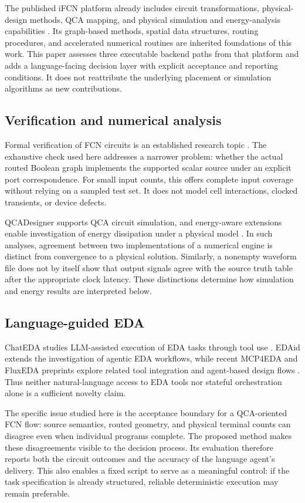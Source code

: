 \documentclass[ASNA,twocolumn]{USG}
\begin{document}
The published iFCN platform already includes circuit transformations, physical-design methods, QCA mapping, and physical simulation and energy-analysis capabilities \cite{Li2026iFCN}. Its graph-based methods, spatial data structures, routing procedures, and accelerated numerical routines are inherited foundations of this work. This paper assesses three executable backend paths from that platform and adds a language-facing decision layer with explicit acceptance and reporting conditions. It does not reattribute the underlying placement or simulation algorithms as new contributions.

\subsection{Verification and numerical analysis}
Formal verification of FCN circuits is an established research topic \cite{Walter2020Verification}. The exhaustive check used here addresses a narrower problem: whether the actual routed Boolean graph implements the supported scalar source under an explicit port correspondence. For small input counts, this offers complete input coverage without relying on a sampled test set. It does not model cell interactions, clocked transients, or device defects.

QCADesigner supports QCA circuit simulation, and energy-aware extensions enable investigation of energy dissipation under a physical model \cite{Walus2004QCADesigner,SillTorres2018Energy}. In such analyses, agreement between two implementations of a numerical engine is distinct from convergence to a physical solution. Similarly, a nonempty waveform file does not by itself show that output signals agree with the source truth table after the appropriate clock latency. These distinctions determine how simulation and energy results are interpreted below.

\subsection{Language-guided EDA}
ChatEDA studies LLM-assisted execution of EDA tasks through tool use \cite{Wu2024ChatEDA}. EDAid extends the investigation of agentic EDA workflows, while recent MCP4EDA and FluxEDA preprints explore related tool integration and agent-based design flows \cite{Wu2025EDAid,Wang2025MCP4EDA,Chen2026FluxEDA}. Thus neither natural-language access to EDA tools nor stateful orchestration alone is a sufficient novelty claim.

The specific issue studied here is the acceptance boundary for a QCA-oriented FCN flow: source semantics, routed geometry, and physical terminal counts can disagree even when individual programs complete. The proposed method makes these disagreements visible to the decision process. Its evaluation therefore reports both the circuit outcomes and the accuracy of the language agent's delivery. This also enables a fixed script to serve as a meaningful control: if the task specification is already structured, reliable deterministic execution may remain preferable.
\end{document}
